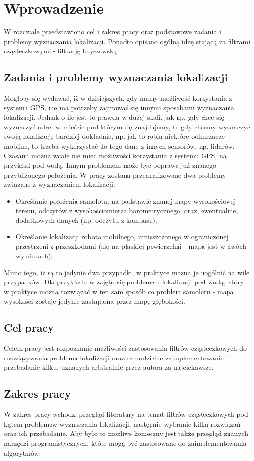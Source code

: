 \chapter{Wprowadzenie}
W rozdziale przedstawiono cel i zakres pracy oraz podstawowe zadania i problemy wyznaczania lokalizacji. Ponadto opisano ogólną ideę stojącą za filtrami cząsteczkowymi - filtrację bayesowską. 
\section{Zadania i problemy wyznaczania lokalizacji}
Mogłoby się wydawać, iż w dzisiejszych, gdy mamy możliwość korzystania z systemu GPS, nie ma potrzeby zajmować się innymi sposobami wyznaczania lokalizacji. Jednak o ile jest to prawdą w dużej skali, jak np. gdy chce się wyznaczyć adres w mieście pod którym się znajdujemy, to gdy chcemy wyznaczyć swoją lokalizację bardziej dokładnie, np. jak to robią niektóre odkurzacze mobilne, to trzeba wykorzystać do tego dane z innych sensorów, np. lidarów. Czasami można wcale nie mieć możliwości korzystania z systemu GPS, na przykład pod wodą. Innym problemem może być poprawa już znanego przybliżonego położenia. W pracy zostaną przeanalizowane dwa problemy związane z wyznaczaniem lokalizacji:
\begin{itemize}
	\item Określanie położenia samolotu, na podstawie znanej mapy wysokościowej terenu, odczytów z wysokościomierza barometrycznego, oraz, ewentualnie, dodatkowych danych (np. odczytu z kompasu). 
	\item Określanie lokalizacji robota mobilnego, umieszczonego w ograniczonej przestrzeni z przeszkodami (ale na płaskiej powierzchni - mapa jest w dwóch wymiarach).
\end{itemize}
Mimo tego, iż są to jedynie dwa przypadki, w praktyce można je uogólnić na wile przypadków. Dla przykładu w \cite{underwater_pf} zajęto się problemem lokalizacji pod wodą, który w praktyce można rozwiązać w ten sam sposób co problem samolotu - mapa wysokości zostaje jedynie zastąpiona przez mapę głębokości.
\section{Cel pracy}
Celem pracy jest rozpoznanie możliwości zastosowania filtrów cząsteczkowych do rozwiązywania problemu lokalizacji oraz samodzielne zaimplementowanie i przebadanie kilku, uznanych arbitralnie przez autora za najciekawsze.
\section{Zakres pracy}
W zakres pracy wchodzi przegląd literatury na temat filtrów cząsteczkowych pod kątem problemów wyznaczania lokalizacji, następnie wybranie kilku rozwiązań oraz ich przebadanie. Aby było to możliwe konieczny jest także przegląd znanych narzędzi programistycznych, które mogą być zastosowane do zaimplementowania algorytmów.

